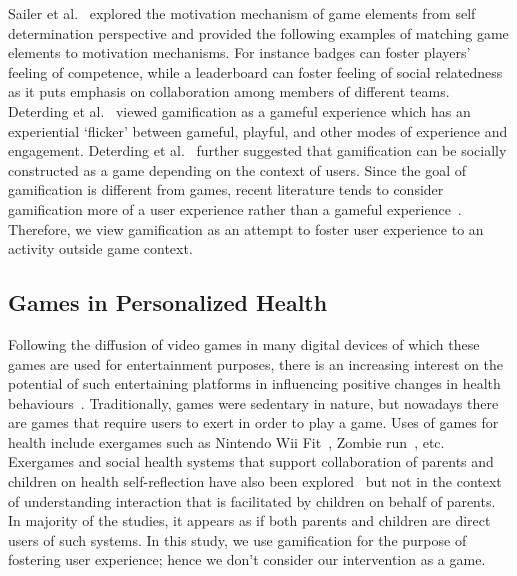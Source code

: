 \documentclass{sig-alternate}
\begin{document}
Sailer et al.~\cite{sailer2013:psychological} explored the motivation mechanism of game elements from self determination perspective and provided the following examples of matching game elements to motivation mechanisms. For instance badges can foster players' feeling of competence, while a leaderboard can foster feeling of social relatedness as it puts emphasis on collaboration among members of different teams. Deterding et al.~\cite{deterding2011game} viewed gamification as a gameful experience which has an experiential `flicker' between gameful, playful, and other modes of experience and engagement. Deterding et al.~\cite{deterding2011game} further suggested that gamification can be socially constructed as a game depending on the context of users. Since the goal of gamification is different from games, recent literature  tends to consider gamification more of a user experience rather than a gameful experience~\cite{seaborn2015:gamification}. Therefore, we view gamification as an attempt to foster user experience to an activity outside game context.

\subsection{Games in Personalized Health}  
Following the diffusion of video games in many digital devices of which these games are used for entertainment purposes, there is an increasing interest on the potential of such entertaining platforms in influencing positive changes in health behaviours~\cite{king2013gamification}. Traditionally, games were sedentary in nature, but nowadays there are games that require users to exert in order to play a game. Uses of games for health include exergames such as Nintendo Wii Fit~\cite{gobel2010serious}, Zombie run~\cite{witkowski2013running}, etc. Exergames and social health systems that support collaboration of parents and children on health self-reflection have also been explored~\cite{grimes2009toward,saksono2015spaceship} but not in the context of understanding interaction that is facilitated by children on behalf of parents. In majority of the studies, it appears as if both parents and children are direct users of such systems. In this study, we use gamification for the purpose of fostering user experience; hence we don't consider our intervention as a game.
\end{document}
